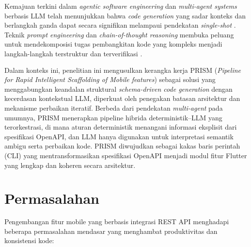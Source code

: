 Kemajuan terkini dalam \textit{agentic software engineering} dan \textit{multi-agent systems} berbasis LLM telah menunjukkan bahwa \textit{code generation} yang sadar konteks dan berlangkah ganda dapat secara signifikan melampaui pendekatan \textit{single-shot} \cite{he2025}. Teknik \textit{prompt engineering} dan \textit{chain-of-thought reasoning} membuka peluang untuk mendekomposisi tugas pembangkitan kode yang kompleks menjadi langkah-langkah terstruktur dan terverifikasi \cite{besta2025}.

Dalam konteks ini, penelitian ini mengusulkan kerangka kerja PRISM (\textit{Pipeline for Rapid Intelligent Scaffolding of Mobile features}) sebagai solusi yang menggabungkan keandalan struktural \textit{schema-driven code generation} dengan kecerdasan kontekstual LLM, diperkuat oleh penegakan batasan arsitektur dan mekanisme perbaikan iteratif. Berbeda dari pendekatan \textit{multi-agent} pada umumnya, PRISM menerapkan pipeline hibrida deterministik--LLM yang terorkestrasi, di mana aturan deterministik menangani informasi eksplisit dari spesifikasi OpenAPI, dan LLM hanya digunakan untuk interpretasi semantik ambigu serta perbaikan kode. PRISM diwujudkan sebagai kakas baris perintah (CLI) yang mentransformasikan spesifikasi OpenAPI menjadi modul fitur Flutter yang lengkap dan koheren secara arsitektur.

\section{Permasalahan}

Pengembangan fitur mobile yang berbasis integrasi REST API menghadapi beberapa permasalahan mendasar yang menghambat produktivitas dan konsistensi kode:

